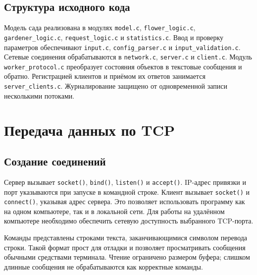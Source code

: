 \documentclass[12pt,a4paper]{article}
\begin{document}
\subsection{Структура исходного кода}
Модель сада реализована в модулях \texttt{model.c}, \texttt{flower\_logic.c}, \texttt{gardener\_logic.c}, \texttt{request\_logic.c} и \texttt{statistics.c}. Ввод и проверку параметров обеспечивают \texttt{input.c}, \texttt{config\_parser.c} и \texttt{input\_validation.c}. Сетевые соединения обрабатываются в \texttt{network.c}, \texttt{server.c} и \texttt{client.c}. Модуль \texttt{worker\_protocol.c} преобразует состояния объектов в текстовые сообщения и обратно. Регистрацией клиентов и приёмом их ответов занимается \texttt{server\_clients.c}. Журналирование защищено от одновременной записи несколькими потоками.

\section{Передача данных по TCP}
\subsection{Создание соединений}
Сервер вызывает \texttt{socket()}, \texttt{bind()}, \texttt{listen()} и \texttt{accept()}. IP-адрес привязки и порт указываются при запуске в командной строке. Клиент вызывает \texttt{socket()} и \texttt{connect()}, указывая адрес сервера. Это позволяет использовать программу как на одном компьютере, так и в локальной сети. Для работы на удалённом компьютере необходимо обеспечить сетевую доступность выбранного TCP-порта.

Команды представлены строками текста, заканчивающимися символом перевода строки. Такой формат прост для отладки и позволяет просматривать сообщения обычными средствами терминала. Чтение ограничено размером буфера; слишком длинные сообщения не обрабатываются как корректные команды.
\end{document}
